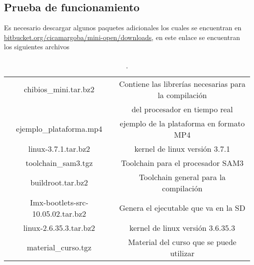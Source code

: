 \documentclass[12pt]{article}
\begin{document}
\subsection{Prueba de funcionamiento}
\noindent
Es necesario descargar algunos paquetes adicionales los cuales se encuentran en \url{bitbucket.org/cicamargoba/mini-open/downloads}, en este enlace se encuentran los siguientes archivos
\begin{table}[H]
  \centering
  \caption{.}
    \begin{tabular}{|c|c|} \hline
      chibios\_mini.tar.bz2 & Contiene las librerías necesarias para la compilación \\
       & del procesador en tiempo real \\ \hline
      ejemplo\_plataforma.mp4 & ejemplo de la plataforma en formato MP4 \\ \hline
      linux-3.7.1.tar.bz2 & kernel de linux versión 3.7.1 \\ \hline
      toolchain\_sam3.tgz & Toolchain para el procesador SAM3 \\ \hline
      buildroot.tar.bz2 & Toolchain general para la compilación \\ \hline
      Imx-bootlets-src-10.05.02.tar.bz2 & Genera el ejecutable que va en la SD \\ \hline
      linux-2.6.35.3.tar.bz2 & kernel de linux versión 3.6.35.3 \\ \hline
      material\_curso.tgz & Material del curso que se puede utilizar \\ \hline
    \end{tabular}
  \label{tab1}
\end{table}
\noindent
\end{document}

